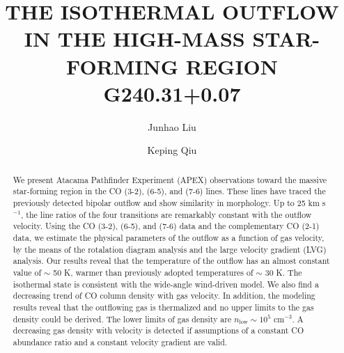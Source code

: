 \documentclass[twocolumn]{aastex62}
\begin{document}
\title{THE ISOTHERMAL OUTFLOW IN THE HIGH-MASS STAR-FORMING REGION G240.31+0.07}




\author{Junhao Liu}

\author{Keping Qiu}

\begin{abstract}
We present Atacama Pathfinder Experiment (APEX) observations toward the massive star-forming region  in the CO (3-2), (6-5), and (7-6) lines. These lines have traced the previously detected bipolar outflow and show similarity in morphology.  Up to 25 km s$^{-1}$, the line ratios of the four transitions are remarkably constant with the outflow velocity. Using the CO (3-2), (6-5), and (7-6) data and the complementary CO (2-1) data, we estimate the physical parameters of the  outflow as a function of gas velocity, by the means of the rotalation diagram analysis and the large velocity gradient (LVG) analysis. Our results reveal that the temperature of the outflow has an almost constant value of $\sim$ 50 K, warmer than previously adopted temperatures of $\sim$ 30 K. The isothermal state is consistent with the wide-angle wind-driven model. We also find a decreasing trend of CO column density with gas velocity. In addition, the modeling results reveal that the outflowing gas is thermalized and no upper limits to the gas density could be derived. The lower limits of gas density are $n_{\mathrm{low}} \sim 10^5$ cm$^{-3}$. A decreasing gas density with velocity is detected if assumptions of a constant CO abundance ratio and a constant velocity gradient are valid.
\end{abstract}








\end{document}
